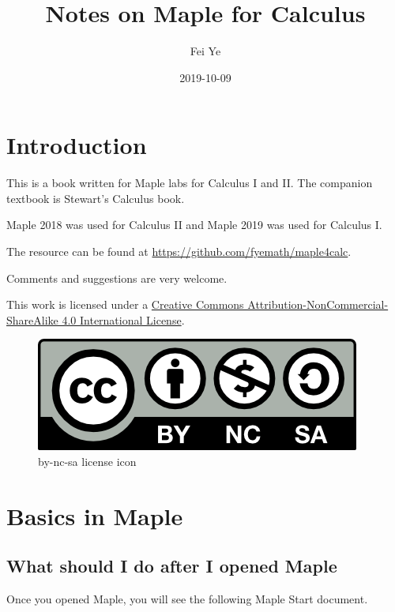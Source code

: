 \documentclass[]{book}
\title{Notes on Maple for Calculus}
\author{Fei Ye}
\date{2019-10-09}
\theoremstyle{definition}
\theoremstyle{definition}
\theoremstyle{definition}
\theoremstyle{remark}
\begin{document}
\maketitle

{
\setcounter{tocdepth}{1}
\tableofcontents
}
\hypertarget{introduction}{%
\chapter*{Introduction}\label{introduction}}

This is a book written for Maple labs for Calculus I and II. The companion textbook is Stewart's Calculus book.

Maple 2018 was used for Calculus II and Maple 2019 was used for Calculus I.

The resource can be found at \url{https://github.com/fyemath/maple4calc}.

Comments and suggestions are very welcome.

This work is licensed under a \href{https://creativecommons.org/licenses/by-nc-sa/4.0/}{Creative Commons Attribution-NonCommercial-ShareAlike 4.0 International License}.

\begin{figure}
\centering
\includegraphics{figs/by-nc-sa.png}
\caption{by-nc-sa license icon}
\end{figure}

\hypertarget{basics-in-maple}{%
\chapter{Basics in Maple}\label{basics-in-maple}}

\hypertarget{what-should-i-do-after-i-opened-maple}{%
\section{What should I do after I opened Maple}\label{what-should-i-do-after-i-opened-maple}}

Once you opened Maple, you will see the following Maple Start document.
\end{document}

